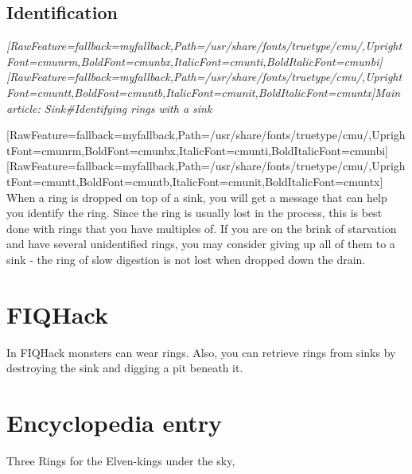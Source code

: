 \subsection{Identification}
\label{8}

\begin{myquote}
\item{}{\itshape \allowbreak{}\setmainfont{cmunti.ttf}[RawFeature={fallback=myfallback},Path=/usr/share/fonts/truetype/cmu/,UprightFont=cmunrm,BoldFont=cmunbx,ItalicFont=cmunti,BoldItalicFont=cmunbi]\setmonofont{cmunti.ttf}[RawFeature={fallback=myfallback},Path=/usr/share/fonts/truetype/cmu/,UprightFont=cmuntt,BoldFont=cmuntb,ItalicFont=cmunit,BoldItalicFont=cmuntx]\itshape Main article: Sink\#Identifying rings with a sink\footnotemark[115]}
\end{myquote}
\allowbreak{}\setmainfont{cmunrm.ttf}[RawFeature={fallback=myfallback},Path=/usr/share/fonts/truetype/cmu/,UprightFont=cmunrm,BoldFont=cmunbx,ItalicFont=cmunti,BoldItalicFont=cmunbi]\setmonofont{cmunrm.ttf}[RawFeature={fallback=myfallback},Path=/usr/share/fonts/truetype/cmu/,UprightFont=cmuntt,BoldFont=cmuntb,ItalicFont=cmunit,BoldItalicFont=cmuntx]
When a ring is dropped on top of a sink\footnotemark[116], you will get a message that can help you identify the ring. Since the ring is usually lost in the process, this is best done with rings that you have multiples of. If you are on the brink of starvation\footnotemark[117] and have several unidentified rings, you may consider giving up all of them to a sink -{} the ring of slow digestion is not lost when dropped down the drain.



\section{FIQHack}
\label{9}
In FIQHack\footnotemark[118] monsters can wear rings.  Also, you can retrieve rings from sinks by destroying the sink and digging a pit beneath it.



\section{Encyclopedia entry}
\label{10}

Three Rings for the Elven-{}kings under the sky,$\text{ }$\newline{}

